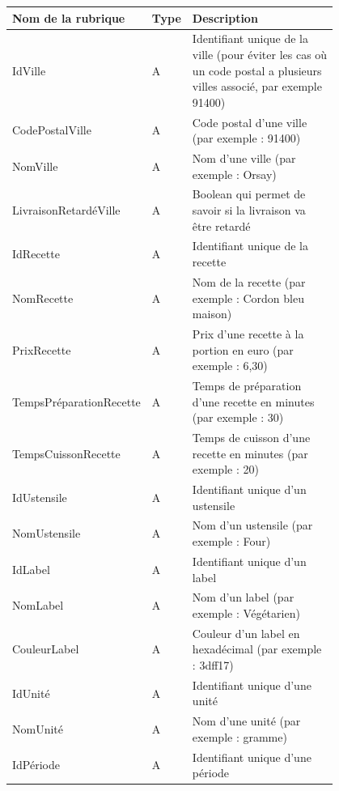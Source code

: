 \documentclass{article}
\begin{document}
\begin{center}
    \begin{longtable}{|p{0.25\linewidth}|p{0.05\linewidth}|p{0.50\linewidth}|}
        \hline
        \textbf{Nom de la rubrique} & \textbf{Type} & \textbf{Description} \\
        \hline 
        \hline
        IdVille & A & Identifiant unique de la ville (pour éviter les cas où un code postal a plusieurs villes associé, par exemple 91400) \\
        \hline 
        CodePostalVille & A & Code postal d'une ville (par exemple : 91400) \\
        \hline 
        NomVille & A & Nom d'une ville (par exemple : Orsay) \\
        \hline 
        LivraisonRetardéVille & A & Boolean qui permet de savoir si la livraison va être retardé \\
        \hline 
        IdRecette & A & Identifiant unique de la recette \\
        \hline 
        NomRecette & A & Nom de la recette (par exemple : Cordon bleu maison) \\
        \hline 
        PrixRecette & A & Prix d'une recette à la portion en euro (par exemple : 6,30) \\
        \hline 
        TempsPréparationRecette & A & Temps de préparation d'une recette en minutes (par exemple : 30) \\
        \hline 
        TempsCuissonRecette & A & Temps de cuisson d'une recette en minutes (par exemple : 20) \\
        \hline 
        IdUstensile & A & Identifiant unique d'un ustensile \\
        \hline 
        NomUstensile & A & Nom d'un ustensile (par exemple : Four) \\
        \hline 
        IdLabel & A & Identifiant unique d'un label \\
        \hline 
        NomLabel & A & Nom d'un label (par exemple : Végétarien) \\
        \hline 
        CouleurLabel & A & Couleur d'un label en hexadécimal (par exemple : 3dff17) \\
        \hline 
        IdUnité & A & Identifiant unique d'une unité \\
        \hline 
        NomUnité & A & Nom d'une unité (par exemple : gramme) \\
        \hline 
        IdPériode & A & Identifiant unique d'une période \\

\end{longtable}
\end{center}
\end{document}
